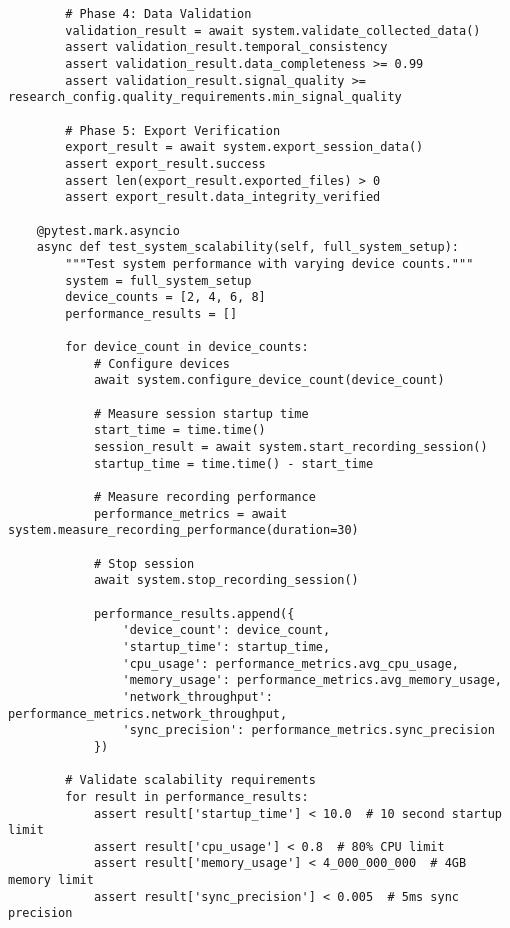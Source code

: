 \documentclass[12pt,a4paper]{article}
\begin{document}
\begin{verbatim}
        # Phase 4: Data Validation
        validation_result = await system.validate_collected_data()
        assert validation_result.temporal_consistency
        assert validation_result.data_completeness >= 0.99
        assert validation_result.signal_quality >= research_config.quality_requirements.min_signal_quality
        
        # Phase 5: Export Verification
        export_result = await system.export_session_data()
        assert export_result.success
        assert len(export_result.exported_files) > 0
        assert export_result.data_integrity_verified
    
    @pytest.mark.asyncio
    async def test_system_scalability(self, full_system_setup):
        """Test system performance with varying device counts."""
        system = full_system_setup
        device_counts = [2, 4, 6, 8]
        performance_results = []
        
        for device_count in device_counts:
            # Configure devices
            await system.configure_device_count(device_count)
            
            # Measure session startup time
            start_time = time.time()
            session_result = await system.start_recording_session()
            startup_time = time.time() - start_time
            
            # Measure recording performance
            performance_metrics = await system.measure_recording_performance(duration=30)
            
            # Stop session
            await system.stop_recording_session()
            
            performance_results.append({
                'device_count': device_count,
                'startup_time': startup_time,
                'cpu_usage': performance_metrics.avg_cpu_usage,
                'memory_usage': performance_metrics.avg_memory_usage,
                'network_throughput': performance_metrics.network_throughput,
                'sync_precision': performance_metrics.sync_precision
            })
        
        # Validate scalability requirements
        for result in performance_results:
            assert result['startup_time'] < 10.0  # 10 second startup limit
            assert result['cpu_usage'] < 0.8  # 80% CPU limit
            assert result['memory_usage'] < 4_000_000_000  # 4GB memory limit
            assert result['sync_precision'] < 0.005  # 5ms sync precision
        

\end{verbatim}
\end{document}
